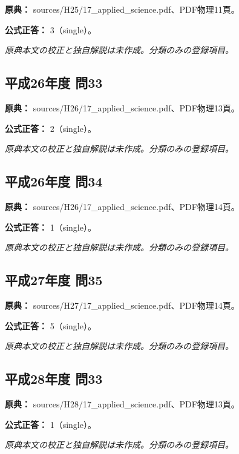 \noindent\textbf{原典：} sources/H25/17\_applied\_science.pdf、PDF物理11頁。

\textbf{公式正答：} 3（single）。

\par\textit{原典本文の校正と独自解説は未作成。分類のみの登録項目。}

\subsection{平成26年度 問33}
\label{q:h26-reg-applied-33}

\noindent\textbf{原典：} sources/H26/17\_applied\_science.pdf、PDF物理13頁。

\textbf{公式正答：} 2（single）。

\par\textit{原典本文の校正と独自解説は未作成。分類のみの登録項目。}

\subsection{平成26年度 問34}
\label{q:h26-reg-applied-34}

\noindent\textbf{原典：} sources/H26/17\_applied\_science.pdf、PDF物理14頁。

\textbf{公式正答：} 1（single）。

\par\textit{原典本文の校正と独自解説は未作成。分類のみの登録項目。}

\subsection{平成27年度 問35}
\label{q:h27-reg-applied-35}

\noindent\textbf{原典：} sources/H27/17\_applied\_science.pdf、PDF物理14頁。

\textbf{公式正答：} 5（single）。

\par\textit{原典本文の校正と独自解説は未作成。分類のみの登録項目。}

\subsection{平成28年度 問33}
\label{q:h28-reg-applied-33}

\noindent\textbf{原典：} sources/H28/17\_applied\_science.pdf、PDF物理13頁。

\textbf{公式正答：} 1（single）。

\par\textit{原典本文の校正と独自解説は未作成。分類のみの登録項目。}

